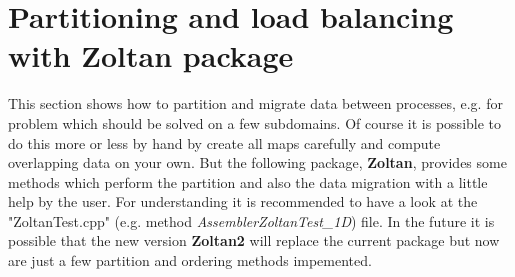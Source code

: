 \documentclass[10pt,a4paper,final,titlepage]{article}
\begin{document}
\section{Partitioning and load balancing with Zoltan package}
This section shows how to partition and migrate data between processes, e.g. for problem which should be solved on a few subdomains. Of course it is possible to do this more or less by hand by create all maps carefully and compute overlapping data on your own. But the following package, \textbf{Zoltan}, provides some methods which perform the partition and also the data migration with a little help by the user. For understanding it is recommended to have a look at the "ZoltanTest.cpp" (e.g. method \textit{AssemblerZoltanTest\_1D}) file. In the future it is possible that the new version \textbf{Zoltan2} will replace the current package but now are just a few partition and ordering methods impemented.
\end{document}
